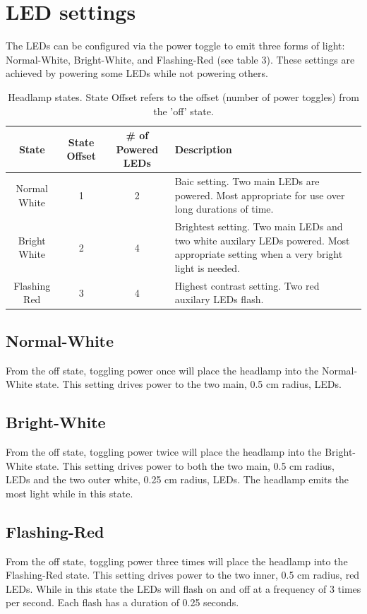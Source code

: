 \documentclass[12pt]{article}
\begin{document}
\section{LED settings}
The LEDs can be configured via the power toggle to emit three forms of light: Normal-White,
Bright-White, and Flashing-Red (see table 3). These settings are achieved by powering some LEDs while not
powering others.

\begin{table}
\begin{center}
\begin{tabular}{ | c | c | c | p{5cm} |}
    \hline
    State & State Offset & \# of Powered LEDs & Description \\ \hline
    Normal White & 1 & 2 &  Baic setting. Two main LEDs are powered. Most appropriate for use over
    long durations of time.\\ \hline
    Bright White & 2 & 4 &  Brightest setting. Two main LEDs and two white auxilary LEDs powered.
    Most appropriate setting when a very bright light is needed.\\ \hline
    Flashing Red & 3 & 4 &  Highest contrast setting. Two red auxilary LEDs flash.\\ \hline
\end{tabular}
\end{center}
\caption[Lamp Power States] {Headlamp states. State Offset refers to the offset (number of power toggles) from the 'off' state.}
\end{table}

\subsection{Normal-White}
From the off state, toggling power once will place the headlamp into the Normal-White state.  This
setting drives power to the two main, 0.5 cm radius, LEDs.

\subsection{Bright-White}
From the off state, toggling power twice will place the headlamp into the Bright-White state.  This
setting drives power to both the two main, 0.5 cm radius, LEDs and the two outer white, 0.25 cm
radius, LEDs. The headlamp emits the most light while in this state.

\subsection{Flashing-Red}
From the off state, toggling power three times will place the headlamp into the Flashing-Red state.
This setting drives power to the two inner, 0.5 cm radius, red LEDs. While in this state the
LEDs will flash on and off at a frequency of 3 times per second. Each flash has a duration of
0.25 seconds.
\end{document}
